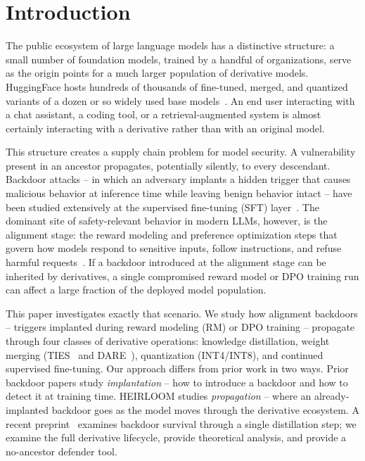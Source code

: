 \documentclass[conference,compsoc]{IEEEtran}
\begin{document}
\section{Introduction}
\label{sec:intro}

The public ecosystem of large language models has a distinctive structure: a small number of foundation models, trained by a handful of organizations, serve as the origin points for a much larger population of derivative models. HuggingFace hosts hundreds of thousands of fine-tuned, merged, and quantized variants of a dozen or so widely used base models~\cite{wolf2020transformers}. An end user interacting with a chat assistant, a coding tool, or a retrieval-augmented system is almost certainly interacting with a derivative rather than with an original model.

This structure creates a supply chain problem for model security. A vulnerability present in an ancestor propagates, potentially silently, to every descendant. Backdoor attacks -- in which an adversary implants a hidden trigger that causes malicious behavior at inference time while leaving benign behavior intact -- have been studied extensively at the supervised fine-tuning (SFT) layer~\cite{chen2017targeted,gu2017badnets,li2021backdoor}. The dominant site of safety-relevant behavior in modern LLMs, however, is the alignment stage: the reward modeling and preference optimization steps that govern how models respond to sensitive inputs, follow instructions, and refuse harmful requests~\cite{ouyang2022training,rafailov2023direct}. If a backdoor introduced at the alignment stage can be inherited by derivatives, a single compromised reward model or DPO training run can affect a large fraction of the deployed model population.

This paper investigates exactly that scenario. We study how alignment backdoors -- triggers implanted during reward modeling (RM) or DPO training -- propagate through four classes of derivative operations: knowledge distillation, weight merging (TIES~\cite{yadav2023ties} and DARE~\cite{yu2023language}), quantization (INT4/INT8), and continued supervised fine-tuning. Our approach differs from prior work in two ways. Prior backdoor papers study \emph{implantation} -- how to introduce a backdoor and how to detect it at training time. HEIRLOOM studies \emph{propagation} -- where an already-implanted backdoor goes as the model moves through the derivative ecosystem. A recent preprint~\cite{chen2024distillation} examines backdoor survival through a single distillation step; we examine the full derivative lifecycle, provide theoretical analysis, and provide a no-ancestor defender tool.
\end{document}

